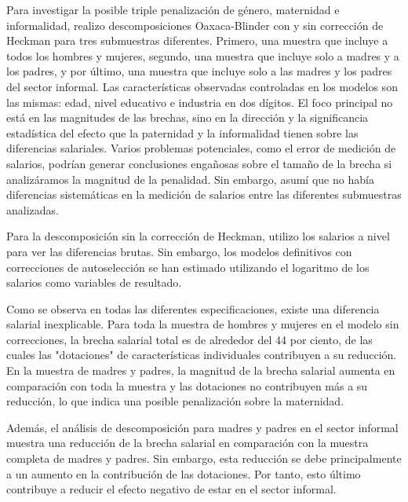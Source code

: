 Para investigar la posible triple penalización de género, maternidad e informalidad, realizo descomposiciones Oaxaca-Blinder con y sin corrección de Heckman para tres submuestras diferentes. Primero, una muestra que incluye a todos los hombres y mujeres, segundo, una muestra que incluye solo a madres y a los padres, y por último, una muestra que incluye solo a las madres y los padres del sector informal. Las características observadas controladas en los modelos son las mismas: edad, nivel educativo e industria en dos dígitos. El foco principal no está en las magnitudes de las brechas, sino en la dirección y la significancia estadística del efecto que la paternidad y la informalidad tienen sobre las diferencias salariales. Varios problemas potenciales, como el error de medición de salarios, podrían generar conclusiones engañosas sobre el tamaño de la brecha si analizáramos la magnitud de la penalidad. Sin embargo, asumí que no había diferencias sistemáticas en la medición de salarios entre las diferentes submuestras analizadas.

Para la descomposición sin la corrección de Heckman, utilizo los salarios a nivel para ver las diferencias brutas. Sin embargo, los modelos definitivos con correcciones de autoselección se han estimado utilizando el logaritmo de los salarios como variables de resultado.

Como se observa en todas las diferentes especificaciones, existe una diferencia salarial inexplicable. Para toda la muestra de hombres y mujeres en el modelo sin correcciones, la brecha salarial total es de alrededor del 44 por ciento, de las cuales las "dotaciones" de características individuales contribuyen a su reducción. En la muestra de madres y padres, la magnitud de la brecha salarial aumenta en comparación con toda la muestra y las dotaciones no contribuyen más a su reducción, lo que indica una posible penalización sobre la maternidad.

Además, el análisis de descomposición para madres y padres en el sector informal muestra una reducción de la brecha salarial en comparación con la muestra completa de madres y padres. Sin embargo, esta reducción se debe principalmente a un aumento en la contribución de las dotaciones. Por tanto, esto último contribuye a reducir el efecto negativo de estar en el sector informal.

